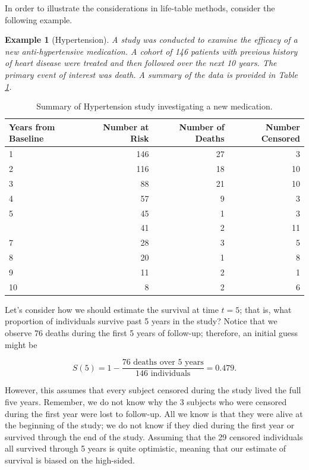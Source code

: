 \documentclass[
]{book}
\theoremstyle{plain}
\theoremstyle{mydefn}
\theoremstyle{myexmpl}
\newtheorem{example}{Example}[chapter]
\theoremstyle{remark}
\begin{document}
In order to illustrate the considerations in life-table methods, consider the following example.

\begin{example}[Hypertension]
A study was conducted to examine the efficacy of a new anti-hypertensive medication. A cohort of 146 patients with previous history of heart disease were treated and then followed over the next 10 years. The primary event of interest was death. A summary of the data is provided in Table \ref{tab:surv-hypertension-data}.
\end{example}

\begin{table}

\caption{\label{tab:surv-hypertension-data}Summary of Hypertension study investigating a new medication.}
\centering
\begin{tabular}[t]{lrrr}
\toprule
Years from Baseline & Number at Risk & Number of Deaths & Number Censored\\
\midrule
1 & 146 & 27 & 3\\
2 & 116 & 18 & 10\\
3 & 88 & 21 & 10\\
4 & 57 & 9 & 3\\
5 & 45 & 1 & 3\\
\addlinespace
6 & 41 & 2 & 11\\
7 & 28 & 3 & 5\\
8 & 20 & 1 & 8\\
9 & 11 & 2 & 1\\
10 & 8 & 2 & 6\\
\bottomrule
\end{tabular}
\end{table}

Let's consider how we should estimate the survival at time \(t = 5\); that is, what proportion of individuals survive past 5 years in the study? Notice that we observe 76 deaths during the first 5 years of follow-up; therefore, an initial guess might be

\[S(5) = 1 - \frac{\text{76 deaths over 5 years}}{\text{146 individuals}} = 0.479.\]

However, this assumes that every subject censored during the study lived the full five years. Remember, we do not know why the 3 subjects who were censored during the first year were lost to follow-up. All we know is that they were alive at the beginning of the study; we do not know if they died during the first year or survived through the end of the study. Assuming that the 29 censored individuals all survived through 5 years is quite optimistic, meaning that our estimate of survival is biased on the high-sided.
\end{document}
